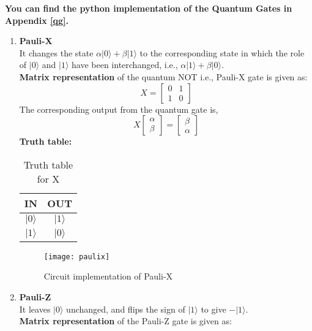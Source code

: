 \documentclass[12pt]{report}
\begin{document}
\textbf{You can find the python implementation of the Quantum Gates in Appendix \ref{qg}.}
\newline
\newline
\begin{enumerate}
\item \textbf{Pauli-X} \\
It changes the state $\alpha|0\rangle + \beta|1\rangle$ to the corresponding state in which the role of $|0\rangle$ and $|1\rangle$ have been interchanged, i.e., $\alpha|1\rangle + \beta|0\rangle$.\\
\textbf{Matrix representation} of the quantum NOT i.e., Pauli-X gate is given as:\\
\begin{equation*}
X = 
\begin{bmatrix} 
0& 1\\ 
1&0 
\end{bmatrix}
\end{equation*}
The corresponding output from the quantum gate is, 
\begin{equation}
X
\begin{bmatrix} 
\alpha\\
\beta
\end{bmatrix} = 
\begin{bmatrix} 
\beta\\
\alpha
\end{bmatrix}
\end{equation}
\textbf{Truth table:}\\
\begin{table}[h!]
\centering
\begin{tabular}{|c|c|}
\hline
IN & OUT\\
\hline
$|0\rangle$ & $|1\rangle$\\
\hline
$|1\rangle$ & $|0\rangle$\\
\hline
\end{tabular}
\caption{Truth table for X} 
\end{table}
\begin{figure}[h]
\centering
\texttt{[image: paulix]}
\caption{Circuit implementation of Pauli-X}
\label{fig:paulix}
\end{figure}
\item \textbf{Pauli-Z}\\
It leaves $|0\rangle$ unchanged, and flips the sign of $|1\rangle$ to give $ -|1\rangle$.\\
\textbf{Matrix representation} of the Pauli-Z gate is given as: 
\begin{equation*}

\end{equation*}
\end{enumerate}
\end{document}
